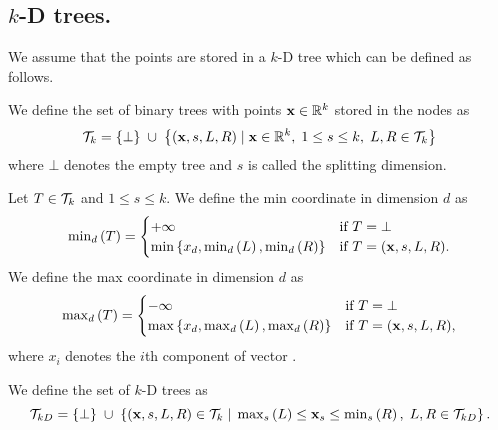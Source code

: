 \subsection{$k$-D trees.}
We assume that the points are stored in a $k$-D tree which can be defined as follows.

\begin{definition}
\label{def:pointtree}
We define the set of binary trees with points $\vc{x}\in\Real^k$ stored in the nodes as
	\begin{displaymath}
		\trees =
			\set{\bot} \;\union\;
			\set{ (\vc{x}, s, L, R) \;|\; \vc{x} \in \Real^k,\; 1 \leq s \leq k,\; L, R \in\trees }
	\end{displaymath}
where $\bot$ denotes the empty tree and $s$ is called the splitting dimension.
\end{definition}

\begin{definition}
\label{def:minmaxcoord}
Let $T\in\trees$ and $1 \leq s \leq k$.
We define the min coordinate in dimension $d$ as
	\begin{displaymath}
		\treemin[d]{T} =
			\begin{cases}
				+\infty & \text{if } T = \bot \\
				\min \set{ x_d, \treemin[d]{L}, \treemin[d]{R} } & \text{if } T = (\vc{x}, s, L, R).
			\end{cases}
	\end{displaymath}
We define the max coordinate in dimension $d$ as
	\begin{displaymath}
		\treemax[d]{T} =
			\begin{cases}
				-\infty & \text{if } T = \bot \\
				\max \set{ x_d, \treemax[d]{L}, \treemax[d]{R} } & \text{if } T = (\vc{x}, s, L, R),
			\end{cases}
	\end{displaymath}
where $x_i$ denotes the $i$th component of vector .
\end{definition}

\begin{definition}[$k$-D tree]
\label{def:kdtree}
We define the set of $k$-D trees as
	\begin{displaymath}
		\kdtrees =
			\set{\bot} \;\union\;
			\set{ (\vc{x}, s, L, R)\in\trees \;|\; \treemax[s]{L} \leq \vc{x}_s \leq \treemin[s]{R},\; L, R \in\kdtrees }.
	\end{displaymath}
\end{definition}


